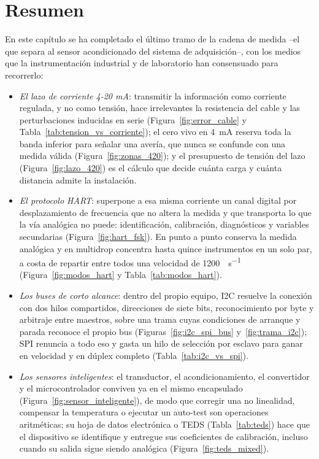 \section{Resumen}\label{sec:resumen_buses}

En este capítulo se ha completado el último tramo de la cadena de medida --el que separa al sensor acondicionado del sistema de adquisición--, con los medios que la instrumentación industrial y de laboratorio han consensuado para recorrerlo:

\begin{itemize}
    \item \emph{El lazo de corriente 4-20 mA}: transmitir la información como corriente regulada, y no como tensión, hace irrelevantes la resistencia del cable y las perturbaciones inducidas en serie (Figura~\ref{fig:error_cable} y Tabla~\ref{tab:tension_vs_corriente}); el cero vivo en \SI{4}{\milli\ampere} reserva toda la banda inferior para señalar una avería, que nunca se confunde con una medida válida (Figura~\ref{fig:zonas_420}); y el presupuesto de tensión del lazo (Figura~\ref{fig:lazo_420}) es el cálculo que decide cuánta carga y cuánta distancia admite la instalación.
    \item \emph{El protocolo HART}: superpone a esa misma corriente un canal digital por desplazamiento de frecuencia que no altera la medida y que transporta lo que la vía analógica no puede: identificación, calibración, diagnósticos y variables secundarias (Figura~\ref{fig:hart_fsk}). En punto a punto conserva la medida analógica y en multidrop concentra hasta quince instrumentos en un solo par, a costa de repartir entre todos una velocidad de \SI{1200}{\bit\per\second} (Figura~\ref{fig:modos_hart} y Tabla~\ref{tab:modos_hart}).
    \item \emph{Los buses de corto alcance}: dentro del propio equipo, I2C resuelve la conexión con dos hilos compartidos, direcciones de siete bits, reconocimiento por byte y arbitraje entre maestros, sobre una trama cuyas condiciones de arranque y parada reconoce el propio bus (Figuras~\ref{fig:i2c_spi_bus} y~\ref{fig:trama_i2c}); SPI renuncia a todo eso y gasta un hilo de selección por esclavo para ganar en velocidad y en dúplex completo (Tabla~\ref{tab:i2c_vs_spi}).
    \item \emph{Los sensores inteligentes}: el transductor, el acondicionamiento, el convertidor y el microcontrolador conviven ya en el mismo encapsulado (Figura~\ref{fig:sensor_inteligente}), de modo que corregir una no linealidad, compensar la temperatura o ejecutar un auto-test son operaciones aritméticas; su hoja de datos electrónica o TEDS (Tabla~\ref{tab:teds}) hace que el dispositivo se identifique y entregue sus coeficientes de calibración, incluso cuando su salida sigue siendo analógica (Figura~\ref{fig:teds_mixed}).

\end{itemize}
